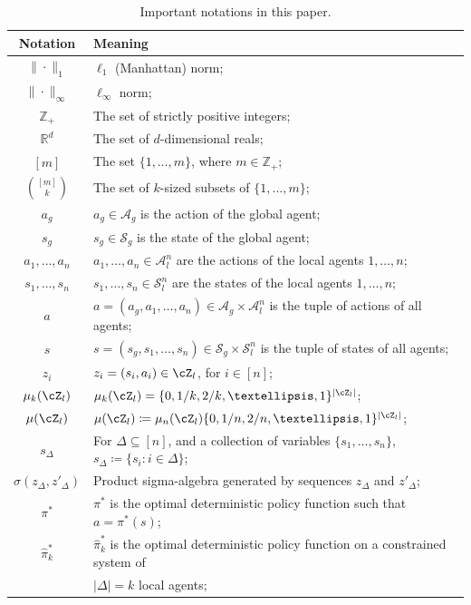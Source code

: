 \documentclass{article}
\theoremstyle{plain}
\theoremstyle{definition}
\begin{document}
\begin{table}[hbt!]
  \centering
  \caption{Important notations in this paper.}\label{table:notations}
  \begin{tabular}{c|l}
  \hline
    \textbf{Notation} & \textbf{Meaning} \\
 \hline
    $\|\cdot\|_1$ & $\ell_1$ (Manhattan) norm; \\
    $\|\cdot\|_\infty$ & $\ell_\infty$ norm; \\
    $\mathbb{Z}_{+}$ & The set of strictly positive integers; \\
    $\mathbb{R}^d$ & The set of $d$-dimensional reals;\\
    $[m]$ & The set $\{1,\dots,m\}$, where $m\in\mathbb{Z}_+$;  \\
    ${[m]\choose k}$ & The set of $k$-sized subsets of $\{1,\dots,m\}$;\\
    $a_g$ & $a_g\in\mathcal{A}_g$ is the action of the global agent;\\
    $s_g$ & $s_g\in\mathcal{S}_g$ is the state of the global agent;\\
    $a_1,\dots,a_n$ & $a_{1},\dots,a_n\in\mathcal{A}_l^n$ are the actions of the local agents $1,\dots,n$;\\
    $s_1,\dots,s_n$ & $s_{1},\dots,s_n\in\mathcal{S}_l^n$ are the states of the local agents $1,\dots,n$;\\
    $a$ & $a=(a_g,a_1,\dots,a_n)\in\mathcal{A}_g\times\mathcal{A}_l^n$ is the tuple of actions of all agents;\\
    $s$ & $s=(s_g,s_1,\dots,s_n)\in\mathcal{S}_g\times\mathcal{S}_l^n$ is the tuple of states of all agents;\\
    $z_i$ & $z_i = (s_i,a_i) \in \cZ_l$, for $i\in[n]$;\\
    $\mu_k(\cZ_l)$ &  $\mu_k(\cZ_l) = \{0,1/k,2/k,\dots,1\}^{|\cZ_l|}$; \\ 
    $\mu(\cZ_l)$ &  $\mu(\cZ_l) \coloneq \mu_n(\cZ_l) \{0,1/n,2/n,\dots,1\}^{|\cZ_l|}$; \\ 
    $s_\Delta$ & For $\Delta\subseteq [n]$, and a collection of variables $\{s_1,\dots,s_n\}$, $s_\Delta\coloneq\{s_i: i\in\Delta\}$;\\
    $\sigma(z_{\Delta}, z'_{\Delta})$ & Product sigma-algebra generated by sequences $z_{\Delta}$ and $z'_{\Delta}$; \\
    $\pi^*$ & $\pi^*$ is the optimal deterministic policy function such that $a = \pi^*(s)$; \\
    $\hat{\pi}_k^*$ & $\hat{\pi}_k^*$ is the optimal deterministic policy function on a constrained system of \\ & \quad\quad $|\Delta|=k$ local agents; \\

\end{tabular}
\end{table}
\end{document}
